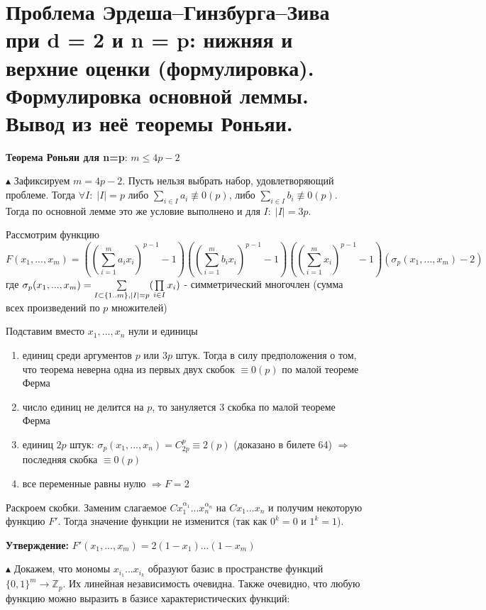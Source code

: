 \section{Проблема Эрдеша–Гинзбурга–Зива при d = 2 и n = p: нижняя и верхние оценки (формулировка). Формулировка основной леммы. Вывод из неё теоремы Роньяи.}
\par \textbf{Теорема Роньяи для n=p}: $m \leq 4p-2$
\par $\blacktriangle$ Зафиксируем $m=4p-2$. Пусть нельзя выбрать набор, удовлетворяющий проблеме. Тогда $\forall I: \; |I|=p$ либо $\sum\limits_{i \in I}a_i \not\equiv 0(p)$, либо $\sum\limits_{i \in I}b_i \not\equiv 0(p)$. Тогда по основной лемме это же условие выполнено и для $I: \; |I|=3p$.
\par Рассмотрим функцию
$$F(x_1, ..., x_m)=\left(\left(\sum_{i = 1}^m a_i x_i\right)^{p-1}-1\right)\left(\left(\sum_{i = 1}^m b_i x_i\right)^{p-1}-1\right)\left(\left(\sum_{i = 1}^m  x_i\right)^{p-1}-1\right)\left(\sigma_p(x_1, ..., x_m)-2\right)$$
где $\sigma_p(x_1, ..., x_m) = \sum\limits_{I \subset \{1..m\},\\ |I|=p}(\prod\limits_{i \in I} x_i)$ - симметрический многочлен (сумма всех произведений по $p$ множителей)
\par Подставим вместо $x_1, ..., x_n$ нули и единицы
\begin{enumerate}
    \item единиц среди аргументов $p$ или $3p$ штук. Тогда в силу предположения о том, что теорема неверна одна из первых двух скобок $\equiv 0(p)$ по малой теореме Ферма
    \item число единиц не делится на $p$, то зануляется 3 скобка по малой теореме Ферма
    \item единиц $2p$ штук: $\sigma_p(x_1, ..., x_n) = C_{2p}^p \equiv 2 (p)$ (доказано в билете 64) $\Rightarrow$ последняя скобка $\equiv 0(p)$
    \item все переменные равны нулю $\Rightarrow F=2$ 
\end{enumerate}
\par Раскроем скобки. Заменим слагаемое $C x_1^{\alpha_1}...x_n^{\alpha_n}$ на $C x_1...x_n$ и получим некоторую функцию $F'$. Тогда значение функции не изменится (так как $0^k=0$ и $1^k=1$). 
\par \textbf{Утверждение: } $F'(x_1, ..., x_m)=2(1-x_1)...(1-x_m)$
\par $\blacktriangle$ Докажем, что мономы $x_{i_1}...x_{i_k}$ образуют базис в пространстве функций $\{0, 1\}^m \rightarrow \mathbb{Z}_p$. Их линейная независимость очевидна. Также очевидно, что любую функцию можно выразить в базисе характеристических функций:
